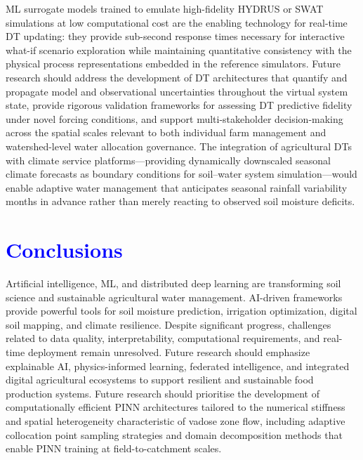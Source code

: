 \documentclass[land,article,submit,pdftex,moreauthors]{Definitions/mdpi}
\numberwithin{equation}{section}
\begin{document}
ML surrogate models trained to emulate high-fidelity HYDRUS or SWAT simulations at low computational cost are the enabling technology for real-time DT updating: they provide sub-second response times necessary for interactive what-if scenario exploration while maintaining quantitative consistency with the physical process representations embedded in the reference simulators. Future research should address the development of DT architectures that quantify and propagate model and observational uncertainties throughout the virtual system state, provide rigorous validation frameworks for assessing DT predictive fidelity under novel forcing conditions, and support multi-stakeholder decision-making across the spatial scales relevant to both individual farm management and watershed-level water allocation governance. The integration of agricultural DTs with climate service platforms---providing dynamically downscaled seasonal climate forecasts as boundary conditions for soil--water system simulation---would enable adaptive water management that anticipates seasonal rainfall variability months in advance rather than merely reacting to observed soil moisture deficits.

\section{\textcolor{blue}{Conclusions}}
Artificial intelligence, ML, and distributed deep learning are transforming soil science and sustainable agricultural water management. AI-driven frameworks provide powerful tools for soil moisture prediction, irrigation optimization, digital soil mapping, and climate resilience. Despite significant progress, challenges related to data quality, interpretability, computational requirements, and real-time deployment remain unresolved. Future research should emphasize explainable AI, physics-informed learning, federated intelligence, and integrated digital agricultural ecosystems to support resilient and sustainable food production systems. Future research should prioritise the development of computationally efficient PINN architectures tailored to the numerical stiffness and spatial heterogeneity characteristic of vadose zone flow, including adaptive collocation point sampling strategies and domain decomposition methods that enable PINN training at field-to-catchment scales. 


\end{document}
